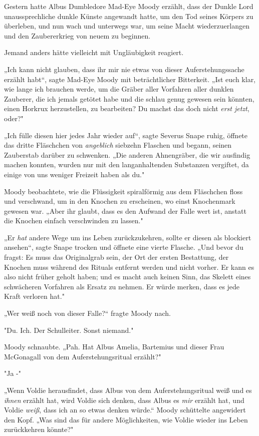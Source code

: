 {Gestern hatte Albus Dumbledore Mad-Eye Moody erzählt, dass der Dunkle Lord unaussprechliche dunkle Künste angewandt hatte, um den Tod seines Körpers zu überleben, und nun wach und unterwegs war, um seine Macht wiederzuerlangen und den Zaubererkrieg von neuem zu beginnen.

Jemand anders hätte vielleicht mit Ungläubigkeit reagiert.

„Ich kann nicht glauben, dass ihr mir nie etwas von dieser Auferstehungssache erzählt habt“, sagte Mad-Eye Moody mit beträchtlicher Bitterkeit. „Ist euch klar, wie lange ich brauchen werde, um die Gräber aller Vorfahren aller dunklen Zauberer, die ich jemals getötet habe und die schlau genug gewesen sein könnten, einen Horkrux herzustellen, zu bearbeiten? Du machst das doch nicht \emph{erst jetzt}, oder?"

„Ich fülle diesen hier jedes Jahr wieder auf“, sagte Severus Snape ruhig, öffnete das dritte Fläschchen von \emph{angeblich} siebzehn Flaschen und begann, seinen Zauberstab darüber zu schwenken. „Die anderen Ahnengräber, die wir ausfindig machen konnten, wurden nur mit den langanhaltenden Substanzen vergiftet, da einige von uns weniger Freizeit haben als du."

Moody beobachtete, wie die Flüssigkeit spiralförmig aus dem Fläschchen floss und verschwand, um in den Knochen zu erscheinen, wo einst Knochenmark gewesen war. „Aber ihr glaubt, dass es den Aufwand der Falle wert ist, anstatt die Knochen einfach verschwinden zu lassen."

„Er \emph{hat} andere Wege um ins Leben zurückzukehren, sollte er diesen als blockiert ansehen“, sagte Snape trocken und öffnete eine vierte Flasche. „Und bevor du fragst: Es muss das Originalgrab sein, der Ort der ersten Bestattung, der Knochen muss während des Rituals entfernt werden und nicht vorher. Er kann es also nicht früher geholt haben; und es macht auch keinen Sinn, das Skelett eines schwächeren Vorfahren als Ersatz zu nehmen. Er würde merken, dass es jede Kraft verloren hat."

„Wer weiß noch von dieser Falle?“ fragte Moody nach.

"Du. Ich. Der Schulleiter. Sonst niemand."

Moody schnaubte. „Pah. Hat Albus Amelia, Bartemius und dieser Frau McGonagall von dem Auferstehungsritual erzählt?"

"Ja -"

„Wenn Voldie herausfindet, dass Albus von dem Auferstehungsritual weiß und es \emph{ihnen} erzählt hat, wird Voldie sich denken, dass Albus es \emph{mir} erzählt hat, und Voldie \emph{weiß}, dass ich an so etwas denken würde.“ Moody schüttelte angewidert den Kopf. „Was sind das für andere Möglichkeiten, wie Voldie wieder ins Leben zurückkehren könnte?"

}
